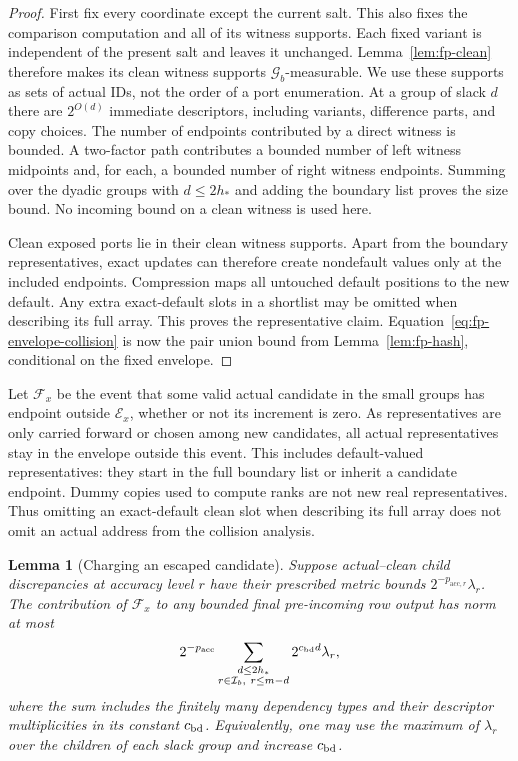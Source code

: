 \documentclass[11pt]{article}
\numberwithin{equation}{section}
\newtheorem{lemma}[theorem]{Lemma}
\theoremstyle{definition}
\theoremstyle{remark}
\begin{document}
\begin{proof}
First fix every coordinate except the current salt. This also fixes the comparison computation and all of its witness supports. Each fixed variant is independent of the present salt and leaves it
unchanged.  Lemma~\ref{lem:fp-clean} therefore makes its clean witness
supports $\mathcal G_b$-measurable.  We use these supports as sets of
actual IDs, not the order of a port enumeration.  At a group of slack
$d$ there are $2^{O(d)}$ immediate descriptors, including variants,
difference parts, and copy choices.  The number of endpoints contributed by a direct
witness is bounded.  A two-factor path contributes a bounded number of
left witness midpoints and, for each, a bounded number of right witness
endpoints.  Summing over the dyadic groups with $d\le2h_*$ and adding the
boundary list proves the size bound.  No incoming bound on a clean
witness is used here.

Clean exposed ports lie in their clean witness supports.  Apart from the
boundary representatives, exact updates can therefore create nondefault
values only at the included endpoints.  Compression maps all untouched
default positions to the new default.  Any extra exact-default slots in
a shortlist may be omitted when describing its full array.  This proves
the representative claim.  Equation~\eqref{eq:fp-envelope-collision}
is now the pair union bound from Lemma~\ref{lem:fp-hash}, conditional on
the fixed envelope.
\end{proof}

Let $\mathcal F_x$ be the event that some valid actual candidate in the
small groups has endpoint outside $\mathcal E_x$, whether or not its
increment is zero.  As representatives are
only carried forward or chosen among new candidates, all actual
representatives stay in the envelope outside this event.
This includes default-valued representatives: they start in the full
boundary list or inherit a candidate endpoint.  Dummy copies used to
compute ranks are not new real representatives.  Thus omitting an
exact-default clean slot when describing its full array does not omit
an actual address from the collision analysis.

\begin{lemma}[Charging an escaped candidate]\label{lem:fp-escape}
Suppose actual--clean child discrepancies at accuracy level ${r}$ have their
prescribed metric bounds $2^{-{p_{\mathrm{acc},r}}}\lambda_{r}$.  The contribution of
$\mathcal F_x$ to any bounded final pre-incoming row output has norm at
most
\begin{equation}
 2^{-{p_{\rm acc}}}\sum_{\substack{d\le2h_*\\{r}\in\mathcal I_b,\ {r}\le {m}-d}}
                 2^{{c_{\rm bd}} d}\lambda_{r},
 \label{eq:fp-escape-charge}
\end{equation}
where the sum includes the finitely many dependency types and their
descriptor multiplicities in its constant ${c_{\rm bd}}$.  Equivalently, one may
use the maximum of $\lambda_{r}$ over the children of each slack group
and increase ${c_{\rm bd}}$.
\end{lemma}
\end{document}
